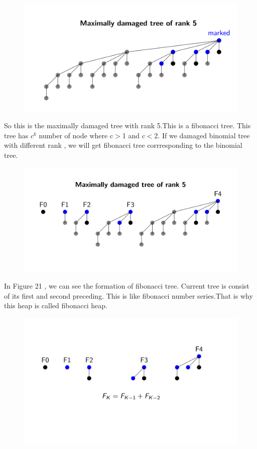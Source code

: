 \documentclass[14pt,a4paper]{report}
\begin{document}
\begin{figure}[H]
    \includegraphics[scale=.3,bb=0 0 404 401]{6.png}
    \caption{}
    \label{fig:six}
\end{figure}
\vspace{1cm}
So this is the maximally damaged tree with rank 5.This is a fibonacci tree. This tree has $c^k$ number of node where c$>$1 and $c<2$. If we damaged binomial tree with different rank , we will get fibonacci tree corrresponding to the binomial tree.
\begin{figure}[H]
    \includegraphics[scale=.3,bb=0 0 404 401]{7.png}
    \caption{}
    \label{fig:six}
\end{figure}
In Figure 21 , we can see the formation of fibonacci tree. Current tree is consist of its first and second preceding. This is like fibonacci number series.That is why this heap is called fibonacci heap.\\
\begin{figure}[H]
    \includegraphics[scale=.3,bb=0 0 400 401]{8.png}
    \caption{}
    \label{fig:six}
\end{figure}
\end{document}
